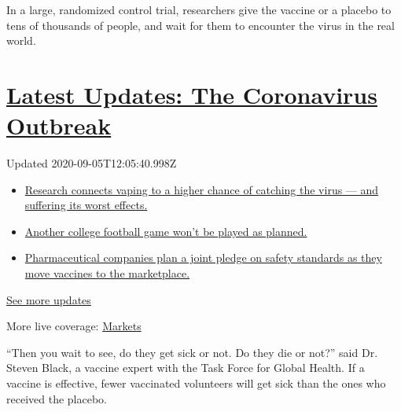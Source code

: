 In a large, randomized control trial, researchers give the vaccine or a
placebo to tens of thousands of people, and wait for them to encounter
the virus in the real world.

\hypertarget{latest-updates-the-coronavirus-outbreak}{%
\section{\texorpdfstring{\href{https://www.nytimes3xbfgragh.onion/2020/09/04/world/covid-19-coronavirus.html?action=click\&pgtype=Article\&state=default\&region=MAIN_CONTENT_1\&context=storylines_live_updates}{Latest
Updates: The Coronavirus
Outbreak}}{Latest Updates: The Coronavirus Outbreak}}\label{latest-updates-the-coronavirus-outbreak}}

Updated 2020-09-05T12:05:40.998Z

\begin{itemize}
\tightlist
\item
  \href{https://www.nytimes3xbfgragh.onion/2020/09/04/world/covid-19-coronavirus.html?action=click\&pgtype=Article\&state=default\&region=MAIN_CONTENT_1\&context=storylines_live_updates\#link-1654f6ad}{Research
  connects vaping to a higher chance of catching the virus --- and
  suffering its worst effects.}
\item
  \href{https://www.nytimes3xbfgragh.onion/2020/09/04/world/covid-19-coronavirus.html?action=click\&pgtype=Article\&state=default\&region=MAIN_CONTENT_1\&context=storylines_live_updates\#link-52e4198a}{Another
  college football game won't be played as planned.}
\item
  \href{https://www.nytimes3xbfgragh.onion/2020/09/04/world/covid-19-coronavirus.html?action=click\&pgtype=Article\&state=default\&region=MAIN_CONTENT_1\&context=storylines_live_updates\#link-181cef0}{Pharmaceutical
  companies plan a joint pledge on safety standards as they move
  vaccines to the marketplace.}
\end{itemize}

\href{https://www.nytimes3xbfgragh.onion/2020/09/04/world/covid-19-coronavirus.html?action=click\&pgtype=Article\&state=default\&region=MAIN_CONTENT_1\&context=storylines_live_updates}{See
more updates}

More live coverage:
\href{https://www.nytimes3xbfgragh.onion/live/2020/09/04/business/stock-market-today-coronavirus?action=click\&pgtype=Article\&state=default\&region=MAIN_CONTENT_1\&context=storylines_live_updates}{Markets}

``Then you wait to see, do they get sick or not. Do they die or not?''
said Dr. Steven Black, a vaccine expert with the Task Force for Global
Health. If a vaccine is effective, fewer vaccinated volunteers will get
sick than the ones who received the placebo.

